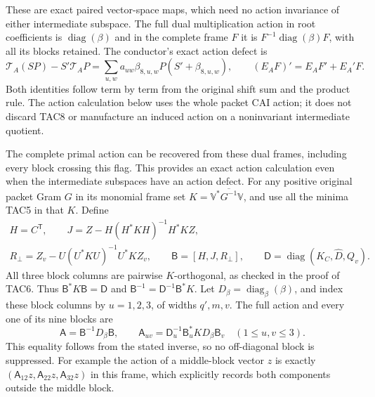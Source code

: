 \documentclass[11pt,a4paper]{article}
\begin{document}
These are exact paired vector-space maps, which need no action
invariance of either intermediate subspace.  The full dual multiplication
action in root coefficients is $\operatorname{diag}(\beta)$ and in
the complete frame $F$ it is
$F^{-1}\operatorname{diag}(\beta)F$, with all its blocks retained.
The conductor's exact action defect is
\[
 \mathcal T_A(SP)-S'\mathcal T_AP
       =\sum_{u,w}a_{uw}\beta_{8,u,w}P(S'+\beta_{8,u,w}),
 \qquad (E_AF)'=E_AF'+E_A'F.
 \tag{TAC8}
\]
Both identities follow term by term from the original shift sum and
the product rule.  The action calculation below uses the whole packet
CAI action; it does not discard TAC8 or manufacture an induced action
on a noninvariant intermediate quotient.


The complete primal action can be recovered from these dual frames,
including every block crossing this flag. This provides an exact action
calculation even when the intermediate subspaces have an action defect.
For any positive original packet Gram $G$ in its monomial frame set
$K=\mathbb V^*\overline{G^{-1}}\mathbb V$, and use all the minima
TAC5 in that $K$. Define
\[
\begin{gathered}
 H=C^{\mathsf T},\qquad
 J=Z-H(H^*KH)^{-1}H^*KZ,\\
 R_\perp=Z_v-U(U^*KU)^{-1}U^*KZ_v,\qquad
 \mathsf B=[H,J,R_\perp],\qquad
 \mathsf D=\operatorname{diag}(K_C,\widehat D,Q_v).
\end{gathered}\tag{TAC8a}
\]
All three block columns are pairwise $K$-orthogonal, as checked in the
proof of TAC6. Thus $\mathsf B^*K\mathsf B=\mathsf D$ and
$\mathsf B^{-1}=\mathsf D^{-1}\mathsf B^*K$. Let
$D_\beta=\operatorname{diag}_{\beta}(\beta)$, and index these block
columns by $u=1,2,3$, of widths $q',m,v$. The full action and every
one of its nine blocks are
\[
 \mathsf A=\mathsf B^{-1}D_\beta\mathsf B,
 \qquad
 \mathsf A_{uv}=\mathsf D_u^{-1}\mathsf B_u^*KD_\beta\mathsf B_v
       \quad(1\le u,v\le3).
 \tag{TAC8b}
\]
This equality follows from the stated inverse, so no off-diagonal
block is suppressed. For example the action of a middle-block vector
$z$ is exactly $(\mathsf A_{12}z,\mathsf A_{22}z,\mathsf A_{32}z)$
in this frame, which explicitly records both components outside the
middle block.
\end{document}

